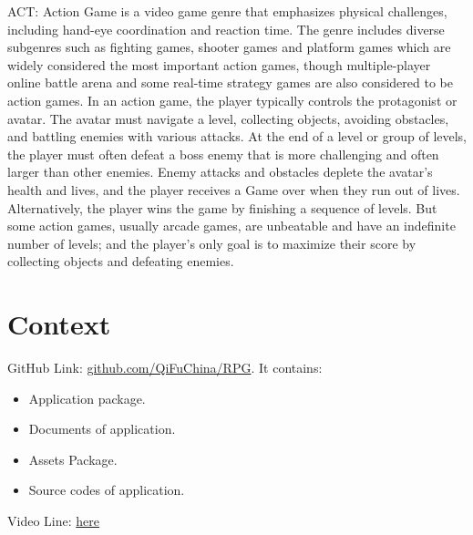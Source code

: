 ACT: Action Game is a video game genre that emphasizes physical challenges, including hand-eye coordination and reaction time. The genre includes diverse subgenres such as fighting games, shooter games and platform games which are widely considered the most important action games, though multiple-player online battle arena and some real-time strategy games are also considered to be action games. In an action game, the player typically controls the protagonist or avatar. The avatar must navigate a level, collecting objects, avoiding obstacles, and battling enemies with various attacks. At the end of a level or group of levels, the player must often defeat a boss enemy that is more challenging and often larger than other enemies. Enemy attacks and obstacles deplete the avatar's health and lives, and the player receives a Game over when they run out of lives. Alternatively, the player wins the game by finishing a sequence of levels. But some action games, usually arcade games, are unbeatable and have an indefinite number of levels; and the player's only goal is to maximize their score by collecting objects and defeating enemies.

\chapter{Context}
GitHub Link: \href{https://github.com/QiFuChina/RPG}{github.com/QiFuChina/RPG}. 
It contains:
\begin{itemize}
\item Application package.
\item Documents of application. 
\item Assets Package.
\item Source codes of application.
\end{itemize}
Video Line: \href{https://youtu.be/4Db_27HFujA}{here}
